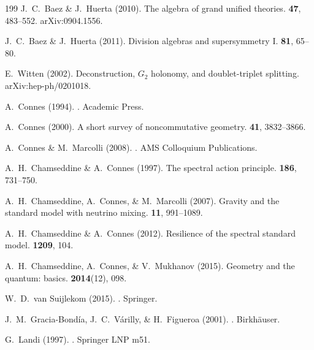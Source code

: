 \documentclass[11pt,a4paper,openright]{book}
\theoremstyle{plain}
\theoremstyle{definition}
\begin{document}
\begin{thebibliography}{199}
J.~C.~Baez \& J.~Huerta (2010).
\newblock The algebra of grand unified theories.
 {\bf 47}, 483--552.
\newblock arXiv:0904.1556.

J.~C.~Baez \& J.~Huerta (2011).
\newblock Division algebras and supersymmetry I.
 {\bf 81}, 65--80.

E.~Witten (2002).
\newblock Deconstruction, $G_2$ holonomy, and doublet-triplet splitting.
\newblock arXiv:hep-ph/0201018.


A.~Connes (1994).
.
\newblock Academic Press.

A.~Connes (2000).
\newblock A short survey of noncommutative geometry.
 {\bf 41}, 3832--3866.

A.~Connes \& M.~Marcolli (2008).
.
\newblock AMS Colloquium Publications.

A.~H.~Chamseddine \& A.~Connes (1997).
\newblock The spectral action principle.
 {\bf 186}, 731--750.

A.~H.~Chamseddine, A.~Connes, \& M.~Marcolli (2007).
\newblock Gravity and the standard model with neutrino mixing.
 {\bf 11}, 991--1089.

A.~H.~Chamseddine \& A.~Connes (2012).
\newblock Resilience of the spectral standard model.
 {\bf 1209}, 104.

A.~H.~Chamseddine, A.~Connes, \& V.~Mukhanov (2015).
\newblock Geometry and the quantum: basics.
 {\bf 2014}(12), 098.

W.~D.~van Suijlekom (2015).
.
\newblock Springer.

J.~M.~Gracia-Bondía, J.~C.~Várilly, \& H.~Figueroa (2001).
.
\newblock Birkhäuser.

G.~Landi (1997).
.
\newblock Springer LNP m51.


\end{thebibliography}
\end{document}
